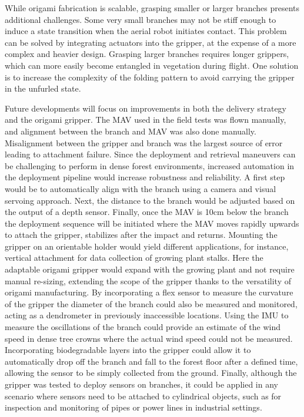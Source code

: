 While origami fabrication is scalable, grasping smaller or larger branches presents additional challenges. Some very small branches may not be stiff enough to induce a state transition when the aerial robot initiates contact. This problem can be solved by integrating actuators into the gripper, at the expense of a more complex and heavier design. Grasping larger branches requires longer grippers, which can more easily become entangled in vegetation during flight. One solution is to increase the complexity of the folding pattern to avoid carrying the gripper in the unfurled state.

Future developments will focus on improvements in both the delivery strategy and the origami gripper. The MAV used in the field tests was flown manually, and alignment between the branch and MAV was also done manually. Misalignment between the gripper and branch was the largest source of error leading to attachment failure. Since the deployment and retrieval maneuvers can be challenging to perform in dense forest environments, increased automation in the deployment pipeline would increase robustness and reliability. A first step would be to automatically align with the branch using a camera and visual servoing approach. Next, the distance to the branch would be adjusted based on the output of a depth sensor. Finally, once the MAV is 10cm below the branch the deployment sequence will be initiated where the MAV moves rapidly upwards to attach the gripper, stabilizes after the impact and returns. Mounting the gripper on an orientable holder would yield different applications, for instance, vertical attachment for data collection of growing plant stalks. Here the adaptable origami gripper would expand with the growing plant and not require manual re-sizing, extending the scope of the gripper thanks to the versatility of origami manufacturing. By incorporating a flex sensor to measure the curvature of the gripper the diameter of the branch could also be measured and monitored, acting as a dendrometer in previously inaccessible locations. Using the IMU to measure the oscillations of the branch could provide an estimate of the wind speed in dense tree crowns where the actual wind speed could not be measured. Incorporating biodegradable layers into the gripper could allow it to automatically drop off the branch and fall to the forest floor after a defined time, allowing the sensor to be simply collected from the ground.
Finally, although the gripper was tested to deploy sensors on branches, it could be applied in any scenario where sensors need to be attached to cylindrical objects, such as for inspection and monitoring of pipes or power lines in industrial settings. 

